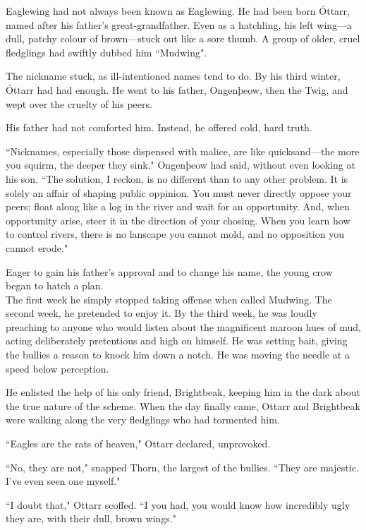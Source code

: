 Eaglewing had not always been known as Eaglewing. He had been born Óttarr, named after his father's great-grandfather. Even as a hatchling, his left wing---a dull, patchy colour of brown---stuck out like a sore thumb. A group of older, cruel fledglings had swiftly dubbed him ``Mudwing".

The nickname stuck, as ill-intentioned names tend to do. By his third winter, Óttarr had had enough. He went to his father, Ongenþeow, then the Twig, and wept over the cruelty of his peers.

His father had not comforted him. Instead, he offered cold, hard truth.

``Nicknames, especially those dispensed with malice, are like quicksand---the more you squirm, the deeper they sink." Ongenþeow had said, without even looking at his son. ``The solution, I reckon, is no different than to any other problem. It is solely an affair of shaping public oppinion. You must never directly oppose your peers; float along like a log in the river and wait for an opportunity. And, when opportunity arise, steer it in the direction of your chosing. When you learn how to control rivers, there is no lanscape you cannot mold, and no opposition you cannot erode."

Eager to gain his father's approval and to change his name, the young crow began to hatch a plan.\\

The first week he simply stopped taking offense when called Mudwing. The second week, he pretended to enjoy it. By the third week, he was loudly preaching to anyone who would listen about the magnificent maroon hues of mud, acting deliberately pretentious and high on himself. He was setting bait, giving the bullies a reason to knock him down a notch. He was moving the needle at a speed below perception.

He enlisted the help of his only friend, Brightbeak, keeping him in the dark about the true nature of the scheme. When the day finally came, Ottarr and Brightbeak were walking along the very fledglings who had tormented him.

``Eagles are the rats of heaven," Ottarr declared, unprovoked.

``No, they are not," snapped Thorn, the largest of the bullies. ``They are majestic. I've even seen one myself."

``I doubt that," Ottarr scoffed. ``I you had, you would know how incredibly ugly they are, with their dull, brown wings."

